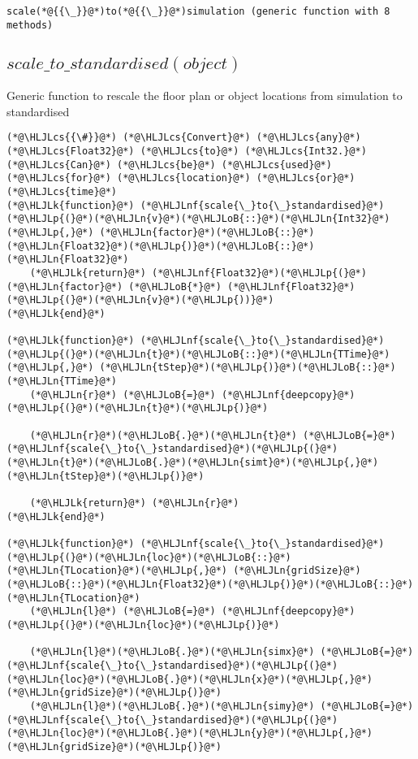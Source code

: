 \documentclass[12pt,a4paper]{article}
\newcommand{\HLJLk}[1]{\textcolor[RGB]{148,91,176}{\textbf{#1}}}
\newcommand{\HLJLn}[1]{#1}
\newcommand{\HLJLnf}[1]{\textcolor[RGB]{66,102,213}{#1}}
\newcommand{\HLJLoB}[1]{\textcolor[RGB]{102,102,102}{\textbf{#1}}}
\newcommand{\HLJLp}[1]{#1}
\newcommand{\HLJLcs}[1]{\textcolor[RGB]{153,153,119}{\textit{#1}}}
\begin{document}
\begin{lstlisting}
scale(*@{{\_}}@*)to(*@{{\_}}@*)simulation (generic function with 8 methods)
\end{lstlisting}


\subsection{$scale\_to\_standardised(object)$}
Generic function to rescale the floor plan or object locations from simulation to standardised


\begin{lstlisting}
(*@\HLJLcs{{\#}}@*) (*@\HLJLcs{Convert}@*) (*@\HLJLcs{any}@*) (*@\HLJLcs{Float32}@*) (*@\HLJLcs{to}@*) (*@\HLJLcs{Int32.}@*) (*@\HLJLcs{Can}@*) (*@\HLJLcs{be}@*) (*@\HLJLcs{used}@*) (*@\HLJLcs{for}@*) (*@\HLJLcs{location}@*) (*@\HLJLcs{or}@*) (*@\HLJLcs{time}@*)
(*@\HLJLk{function}@*) (*@\HLJLnf{scale{\_}to{\_}standardised}@*)(*@\HLJLp{(}@*)(*@\HLJLn{v}@*)(*@\HLJLoB{::}@*)(*@\HLJLn{Int32}@*)(*@\HLJLp{,}@*) (*@\HLJLn{factor}@*)(*@\HLJLoB{::}@*)(*@\HLJLn{Float32}@*)(*@\HLJLp{)}@*)(*@\HLJLoB{::}@*)(*@\HLJLn{Float32}@*)
    (*@\HLJLk{return}@*) (*@\HLJLnf{Float32}@*)(*@\HLJLp{(}@*)(*@\HLJLn{factor}@*) (*@\HLJLoB{*}@*) (*@\HLJLnf{Float32}@*)(*@\HLJLp{(}@*)(*@\HLJLn{v}@*)(*@\HLJLp{))}@*)
(*@\HLJLk{end}@*)

(*@\HLJLk{function}@*) (*@\HLJLnf{scale{\_}to{\_}standardised}@*)(*@\HLJLp{(}@*)(*@\HLJLn{t}@*)(*@\HLJLoB{::}@*)(*@\HLJLn{TTime}@*)(*@\HLJLp{,}@*) (*@\HLJLn{tStep}@*)(*@\HLJLp{)}@*)(*@\HLJLoB{::}@*)(*@\HLJLn{TTime}@*)
    (*@\HLJLn{r}@*) (*@\HLJLoB{=}@*) (*@\HLJLnf{deepcopy}@*)(*@\HLJLp{(}@*)(*@\HLJLn{t}@*)(*@\HLJLp{)}@*)

    (*@\HLJLn{r}@*)(*@\HLJLoB{.}@*)(*@\HLJLn{t}@*) (*@\HLJLoB{=}@*) (*@\HLJLnf{scale{\_}to{\_}standardised}@*)(*@\HLJLp{(}@*)(*@\HLJLn{t}@*)(*@\HLJLoB{.}@*)(*@\HLJLn{simt}@*)(*@\HLJLp{,}@*) (*@\HLJLn{tStep}@*)(*@\HLJLp{)}@*)

    (*@\HLJLk{return}@*) (*@\HLJLn{r}@*)
(*@\HLJLk{end}@*)

(*@\HLJLk{function}@*) (*@\HLJLnf{scale{\_}to{\_}standardised}@*)(*@\HLJLp{(}@*)(*@\HLJLn{loc}@*)(*@\HLJLoB{::}@*)(*@\HLJLn{TLocation}@*)(*@\HLJLp{,}@*) (*@\HLJLn{gridSize}@*)(*@\HLJLoB{::}@*)(*@\HLJLn{Float32}@*)(*@\HLJLp{)}@*)(*@\HLJLoB{::}@*)(*@\HLJLn{TLocation}@*)
    (*@\HLJLn{l}@*) (*@\HLJLoB{=}@*) (*@\HLJLnf{deepcopy}@*)(*@\HLJLp{(}@*)(*@\HLJLn{loc}@*)(*@\HLJLp{)}@*)

    (*@\HLJLn{l}@*)(*@\HLJLoB{.}@*)(*@\HLJLn{simx}@*) (*@\HLJLoB{=}@*) (*@\HLJLnf{scale{\_}to{\_}standardised}@*)(*@\HLJLp{(}@*)(*@\HLJLn{loc}@*)(*@\HLJLoB{.}@*)(*@\HLJLn{x}@*)(*@\HLJLp{,}@*) (*@\HLJLn{gridSize}@*)(*@\HLJLp{)}@*)
    (*@\HLJLn{l}@*)(*@\HLJLoB{.}@*)(*@\HLJLn{simy}@*) (*@\HLJLoB{=}@*) (*@\HLJLnf{scale{\_}to{\_}standardised}@*)(*@\HLJLp{(}@*)(*@\HLJLn{loc}@*)(*@\HLJLoB{.}@*)(*@\HLJLn{y}@*)(*@\HLJLp{,}@*) (*@\HLJLn{gridSize}@*)(*@\HLJLp{)}@*)


\end{lstlisting}
\end{document}
